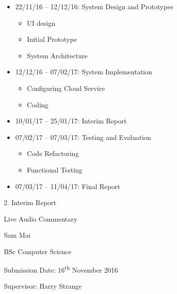 \documentclass{article}
\begin{document}
\begin{flushleft}
\begin{itemize}
\begin{itemize}
	\end{itemize}
	\item 22/11/16 – 12/12/16: System Design and Prototypes
	\begin{itemize}
		\item UI design 
		\item Initial Prototype 
		\item System Architecture
	\end{itemize} 
	\item 12/12/16 – 07/02/17: System Implementation
	\begin{itemize}
		\item Configuring Cloud Service
		\item Coding
	\end{itemize}
	\item 10/01/17 – 25/01/17: Interim Report
	\item 07/02/17 – 07/03/17: Testing and Evaluation
	\begin{itemize}
		\item Code Refactoring
		\item Functional Testing
	\end{itemize}
	\item 07/03/17 – 11/04/17: Final Report
\end{itemize}
{\large 2. Interim Report}
\end{flushleft}
\newpage
\begin{center}
{\Huge Live Audio Commentary\\[5cm]}

{\Large Sam Mai

BSc Computer Science

Submission Date: 16\textsuperscript{th} November 2016

Supervisor: Harry Strange}
\end{center}
\newpage
\end{document}
